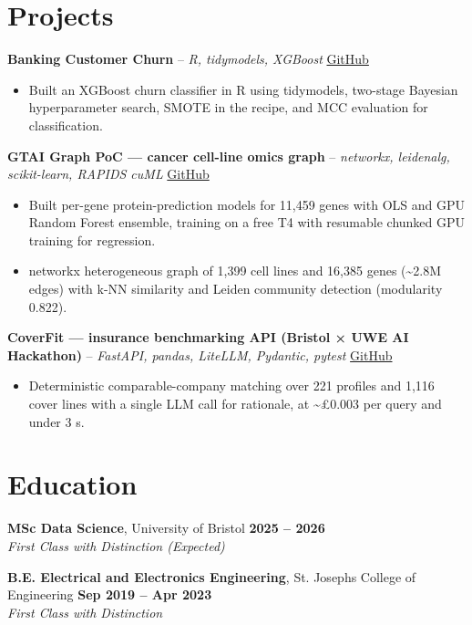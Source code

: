 \documentclass[a4paper,11pt]{article}
\begin{document}
\section{Projects}
\noindent\textbf{Banking Customer Churn} -- \textit{R, tidymodels, XGBoost} \hfill \href{https://github.com/Thiruvel-AP/Banking-Customer-Churn-Prediction}{GitHub}
\begin{itemize}
  \item Built an XGBoost churn classifier in R using tidymodels, two-stage Bayesian hyperparameter search, SMOTE in the recipe, and MCC evaluation for classification.
\end{itemize}
\vspace{3pt}
\noindent\textbf{GTAI Graph PoC — cancer cell-line omics graph} -- \textit{networkx, leidenalg, scikit-learn, RAPIDS cuML} \hfill \href{https://github.com/Thiruvel-AP/GTAI-GraphPOC}{GitHub}
\begin{itemize}
  \item Built per-gene protein-prediction models for 11,459 genes with OLS and GPU Random Forest ensemble, training on a free T4 with resumable chunked GPU training for regression.
  \item networkx heterogeneous graph of 1,399 cell lines and 16,385 genes (\textasciitilde{}2.8M edges) with k-NN similarity and Leiden community detection (modularity 0.822).
\end{itemize}
\vspace{3pt}
\noindent\textbf{CoverFit — insurance benchmarking API (Bristol × UWE AI Hackathon)} -- \textit{FastAPI, pandas, LiteLLM, Pydantic, pytest} \hfill \href{https://github.com/Thiruvel-AP/AIHackathon-Phoenix}{GitHub}
\begin{itemize}
  \item Deterministic comparable-company matching over 221 profiles and 1,116 cover lines with a single LLM call for rationale, at \textasciitilde{}£0.003 per query and under 3 s.
\end{itemize}

\section{Education}
\textbf{MSc Data Science}, University of Bristol \hfill \textbf{2025 – 2026}\\ \textit{First Class with Distinction (Expected)}\par
\vspace{3pt}
\textbf{B.E. Electrical and Electronics Engineering}, St. Joseph\textquotesingle{}s College of Engineering \hfill \textbf{Sep 2019 – Apr 2023}\\ \textit{First Class with Distinction}\par
\end{document}
